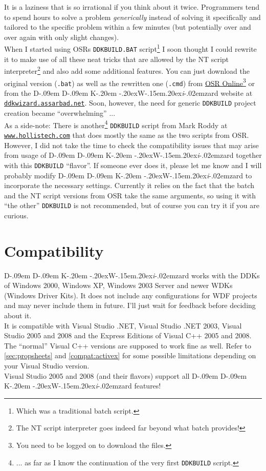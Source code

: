 \documentclass[a4paper,titlepage]{report}
\newcommand{\linkclr}[1]{\textcolor[rgb]{0.00,0.00,0.60}{#1}}
\newcommand{\extlink}[2]{\href{#1}{\linkclr{#2}}}
\newcommand{\extlinktt}[2]{\href{#1}{\texttt{\linkclr{#2}}}}
\def\ddkwiz{D\kern-.09em D\kern-.09em K\kern-.20em \raise-.20ex\hbox{W}\kern-.15em\raise.20ex\hbox{\it{i}}\kern-.02em{zard}}
\begin{document}
It is a laziness that is so irrational if you think about it twice.
Programmers tend to spend hours to solve a problem \emph{generically}\texttrademark{}
instead of solving it specifically and tailored to the specific problem within a few
minutes (but potentially over and over again with only slight changes).\\

When I started using OSRs \texttt{DDKBUILD.BAT} script\footnote{Which was a traditional batch script.}
I soon thought I could rewrite it to make use of all these neat tricks
that are allowed by the NT script interpreter\footnote{The NT script interpreter
goes indeed far beyond what batch provides!} and also add some additional features.
You can just download the original version (\texttt{.bat}) as well as the rewritten
one (\texttt{.cmd}) from \extlink{http://www.osronline.com/article.cfm?article=43}{OSR
Online}\footnote{You need to be logged on to download the files.}
or from the \ddkwiz{} website at \extlinktt{http://ddkwizard.assarbad.net}{ddkwizard.assarbad.net}.
Soon, however, the need for generic \texttt{DDKBUILD} project creation became ``overwhelming'' ...\\

As a side-note: There is another\footnote{... as far as I know the continuation of
the very first \texttt{DDKBUILD} script.} \texttt{DDKBUILD} script from Mark Roddy at
\extlinktt{http://www.hollistech.com}{www.hollistech.com}
that does mostly the same as the two scripts from OSR. However, I did not take the time
to check the compatibility issues that may arise from usage of \ddkwiz{} together
with this \texttt{DDKBUILD} ``flavor''. If someone ever does it, please let me know
and I will probably modify \ddkwiz{} to incorporate the necessary
settings. Currently it relies on the fact that the batch and the NT script
versions from OSR take the same arguments, so using it with ``the other''
\texttt{DDKBUILD} is not recommended, but of course you can try it if you are curious.

\section*{Compatibility}
\ddkwiz{} works with the DDKs of
Windows 2000, Windows XP, Windows 2003 Server and newer WDKs (Windows Driver Kits).
It does not include any configurations for WDF projects and may never include
them in future. I'll just wait for feedback before deciding about it.\\
It is compatible with Visual Studio .NET, Visual Studio .NET 2003, Visual Studio 2005
and 2008 and the Express Editions of Visual C++ 2005 and 2008. The ``normal''
Visual C++ versions are supposed to work fine as well. Refer to \autoref{sec:propsheets}
and \autoref{compat:activex} for some possible limitations depending
on your Visual Studio version.\\
Visual Studio 2005 and 2008 (and their flavors) support all \ddkwiz{} features!
\end{document}
